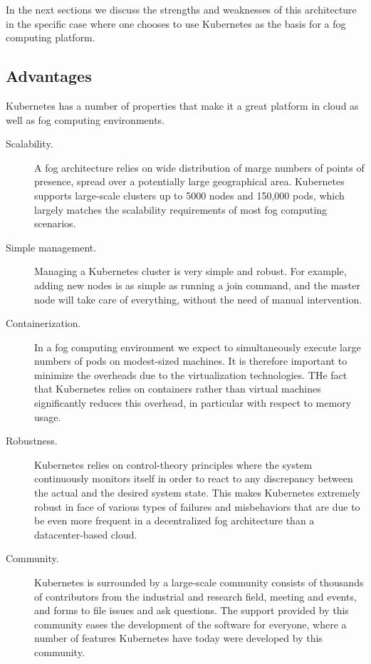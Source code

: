 \documentclass[letterpaper,twocolumn,10pt]{article}
\begin{document}
\medskip In the next sections we discuss the strengths and weaknesses
of this architecture in the specific case where one chooses to use
Kubernetes as the basis for a fog computing platform.


\subsection{Advantages}

Kubernetes has a number of properties that make it a great platform in
cloud as well as fog computing environments.


\begin{description}
\item[Scalability.] A fog architecture relies on wide distribution of
  marge numbers of points of presence, spread over a potentially large
  geographical area. Kubernetes supports large-scale clusters up to
  5000 nodes and 150,000 pods, which largely matches the scalability
  requirements of most fog computing scenarios.

\item[Simple management.] Managing a Kubernetes cluster is very simple
  and robust. For example, adding new nodes is as simple as running a
  join command, and the master node will take care of everything,
  without the need of manual intervention.

\item[Containerization.] In a fog computing environment we expect to
  simultaneously execute large numbers of pods on modest-sized
  machines. It is therefore important to minimize the overheads due to
  the virtualization technologies. THe fact that Kubernetes relies on
  containers rather than virtual machines significantly reduces this
  overhead, in particular with respect to memory usage.

\item[Robustness.] Kubernetes relies on control-theory principles
  where the system continuously monitors itself in order to react to
  any discrepancy between the actual and the desired system
  state. This makes Kubernetes extremely robust in face of various
  types of failures and misbehaviors that are due to be even more
  frequent in a decentralized fog architecture than a datacenter-based
  cloud.

\item[Community.] Kubernetes is surrounded by a large-scale community
  consists of thousands of contributors from the industrial and
  research field, meeting and events, and forms to file issues and ask
  questions.  The support provided by this community eases the
  development of the software for everyone, where a number of features
  Kubernetes have today were developed by this community.
\end{description}
\end{document}
